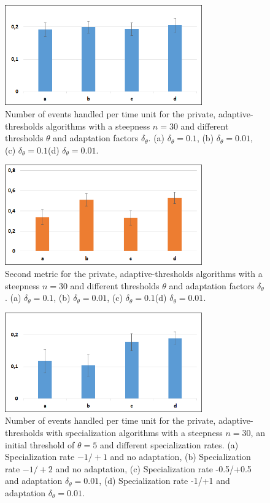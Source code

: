 	\begin{figure}[thpb]
      \centering
      \includegraphics[width=8.5cm]{Pictures/PrivAdaptMetric1.png}
      \caption{Number of events handled per time unit for the private, adaptive-thresholds algorithms with a steepness $n=30$ and different thresholds $\theta$ and adaptation factors $\delta_{\theta}$. (a) $\delta_{\theta}=0.1$, (b) $\delta_{\theta}=0.01$, (c) $\delta_{\theta}=0.1$(d) $\delta_{\theta}=0.01$.}
      \label{figure3}
   \end{figure}
	\begin{figure}[thpb]
      \centering
      \includegraphics[width=8.5cm]{Pictures/PrivAdaptMetric2.png}
      \caption{Second metric for the private, adaptive-thresholds algorithms with a steepness $n=30$ and different thresholds $\theta$ and adaptation factors $\delta_{\theta}$. (a) $\delta_{\theta}=0.1$, (b) $\delta_{\theta}=0.01$, (c) $\delta_{\theta}=0.1$(d) $\delta_{\theta}=0.01$.}
      \label{figure4}
   \end{figure}
	\begin{figure}[thpb]
      \centering
      \includegraphics[width=8.5cm]{Pictures/PrivSpecMetric1.png}
      \caption{Number of events handled per time unit for the private, adaptive-thresholds with specialization algorithms with a steepness $n=30$, an initial threshold of $\theta=5$ and different specialization rates. (a) Specialization rate $-1/+1$ and no adaptation, (b) Specialization rate $-1/+2$ and no adaptation, (c) Specialization rate -0.5/+0.5 and adaptation $\delta_{\theta}=0.01$, (d) Specialization rate -1/+1 and adaptation $\delta_{\theta}=0.01$.}
      \label{figure5}
   \end{figure}
